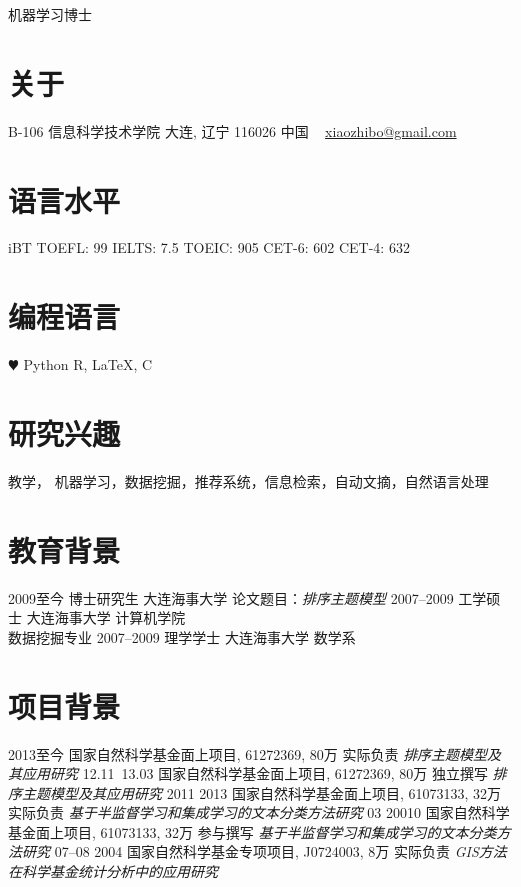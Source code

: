 \documentclass[]{friggeri-cv}
\begin{document}
       {机器学习博士}


\begin{aside}
  \section{关于}
    B-106
    信息科学技术学院
    大连, 辽宁 116026
    中国
    ~
    \href{mailto:xiaozhibo@gmail.com}{xiaozhibo@gmail.com}
  \section{语言水平}
    iBT TOEFL: 99
    IELTS: 7.5
    TOEIC: 905
    CET-6: 602
    CET-4: 632
  \section{编程语言}
    {\color{red} $\varheartsuit$} Python
    R, \LaTeX, C
\end{aside}

\section{研究兴趣}

教学， 机器学习，数据挖掘，推荐系统，信息检索，自动文摘，自然语言处理


\section{教育背景}


\begin{entrylist}
  \entry
    {2009至今}
    {博士研究生}
    {大连海事大学}
    {论文题目：\emph{排序主题模型}}
  \entry
    {2007–2009}
    {工学硕士}
    {大连海事大学}
    {计算机学院\\
    数据挖掘专业}
  \entry
    {2007–2009}
    {理学学士}
    {大连海事大学}
    {数学系}
\end{entrylist}

\section{项目背景}

\begin{entrylist}
  \entry
    {2013至今}
    {国家自然科学基金面上项目, 61272369, 80万}
    {实际负责}
    {\emph{排序主题模型及其应用研究}}
  \entry
    {12.11~13.03}
    {国家自然科学基金面上项目, 61272369, 80万}
    {独立撰写}
    {\emph{排序主题模型及其应用研究}}
  \entry
    {2011 2013}
    {国家自然科学基金面上项目, 61073133, 32万}
    {实际负责}
    {\emph{基于半监督学习和集成学习的文本分类方法研究}}
  \entry
    {03 20010}
    {国家自然科学基金面上项目, 61073133, 32万}
    {参与撰写}
    {\emph{基于半监督学习和集成学习的文本分类方法研究}}
  \entry
    {07–08 2004}
    {国家自然科学基金专项项目, J0724003, 8万}
    {实际负责}
    {\emph{GIS方法在科学基金统计分析中的应用研究}}
\end{entrylist}
\end{document}
